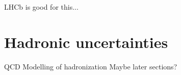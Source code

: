 LHCb is good for this...



\section{Hadronic uncertainties}
QCD
Modelling of hadronization
Maybe later sections?


%


%
%

%

